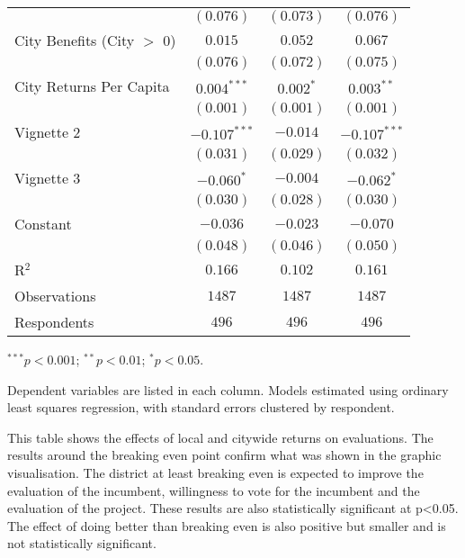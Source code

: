 \documentclass[12pt,letterpaper]{article}
\begin{document}
\begin{table}[H]
\begin{center}
{\begin{threeparttable}
\begin{tabular}{l c c c}
					& $(0.076)$      & $(0.073)$    & $(0.076)$      \\
					City Benefits (City $>$ 0)                      & $0.015$        & $0.052$      & $0.067$        \\
					& $(0.076)$      & $(0.072)$    & $(0.075)$      \\
					City Returns Per Capita                         & $0.004^{***}$  & $0.002^{*}$  & $0.003^{**}$   \\
					& $(0.001)$      & $(0.001)$    & $(0.001)$      \\
					Vignette 2                                      & $-0.107^{***}$ & $-0.014$     & $-0.107^{***}$ \\
					& $(0.031)$      & $(0.029)$    & $(0.032)$      \\
					Vignette 3                                      & $-0.060^{*}$   & $-0.004$     & $-0.062^{*}$   \\
					& $(0.030)$      & $(0.028)$    & $(0.030)$      \\
					Constant                                        & $-0.036$       & $-0.023$     & $-0.070$       \\
					& $(0.048)$      & $(0.046)$    & $(0.050)$      \\
					\midrule
					R$^2$                                           & $0.166$        & $0.102$      & $0.161$        \\
					Observations                                    & $1487$         & $1487$       & $1487$         \\
					Respondents                                     & $496$          & $496$        & $496$          \\
					\bottomrule
				\end{tabular}
				\begin{tablenotes}[flushleft]
					\scriptsize{\item[\hspace{-5mm}] $^{***}p<0.001$; $^{**}p<0.01$; $^{*}p<0.05$. \item[\hspace{-5mm}] Dependent variables are listed in each column. 
						Models estimated using ordinary least squares regression, with standard errors clustered by respondent.}
				\end{tablenotes}
			\end{threeparttable}
		}
		\label{tab:table1}
	\end{center}
\end{table}
\newpage
This table shows the effects of local and citywide returns on evaluations. The results around the breaking even point confirm what was shown in the graphic visualisation. The district at least breaking even is expected to improve the evaluation of the incumbent, willingness to vote for the incumbent and the evaluation of the project. These results are also statistically significant at p<0.05. The effect of doing better than breaking even is also positive but smaller and is not statistically significant.\\
\end{document}
